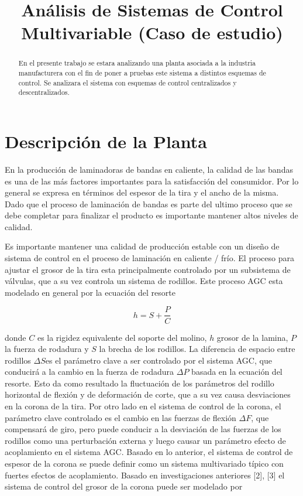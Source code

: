 \documentclass[journal,twoside,web]{ieeecolor}
\begin{document}
	
\title{Análisis de Sistemas de Control Multivariable (Caso de estudio)}
\maketitle

\begin{abstract}
En el presente trabajo se estara analizando una planta asociada a la industria manufacturera con el fin de poner a pruebas este sistema a distintos esquemas de control. Se analizara el sistema con esquemas de control centralizados y descentralizados.
\end{abstract}


\section{Descripción de la Planta}
En la producción de laminadoras de bandas en caliente, la calidad de las bandas es una de las más factores importantes para la satisfacción del consumidor. Por lo general se expresa en términos del espesor de la tira y el ancho de la misma. Dado que el proceso de laminación de bandas es parte del ultimo proceso que se debe completar para finalizar el producto es importante mantener altos niveles de calidad.

Es importante mantener una calidad de producción estable con un diseño de sistema de control en el proceso de laminación en caliente / frío. El proceso para ajustar el grosor de la tira esta principalmente controlado por un subsistema de válvulas, que a su vez controla un sistema de rodillos. Este proceso AGC esta modelado en general por la  ecuación del resorte

\begin{equation}
	h = S + \frac{P}{C}
\end{equation}

donde $C$ es la rigidez equivalente del soporte del molino, $h$ grosor de la lamina, $P$ la fuerza de rodadura y $S$ la brecha de los rodillos. La diferencia de espacio entre rodillos $\Delta S$es el parámetro clave a ser controlado por el sistema AGC, que conducirá a la cambio en la fuerza de rodadura $\Delta P$ basada en la ecuación del resorte. Esto da como resultado la fluctuación de los parámetros del rodillo horizontal de flexión y de deformación de corte, que a su vez causa desviaciones en la corona de la tira. Por otro lado en el sistema de control de la corona, el parámetro clave controlado es el cambio en las fuerzas de flexión $\Delta F$, que compensará de giro, pero puede conducir a la desviación de las fuerzas de los rodillos como una perturbación externa y luego causar un parámetro efecto de acoplamiento en el sistema AGC. Basado en lo anterior, el sistema de control de espesor de la corona se puede definir como un sistema multivariado típico con fuertes efectos de acoplamiento. Basado en investigaciones anteriores [2], [3] el sistema de control del grosor de la corona puede ser modelado por
\end{document}
